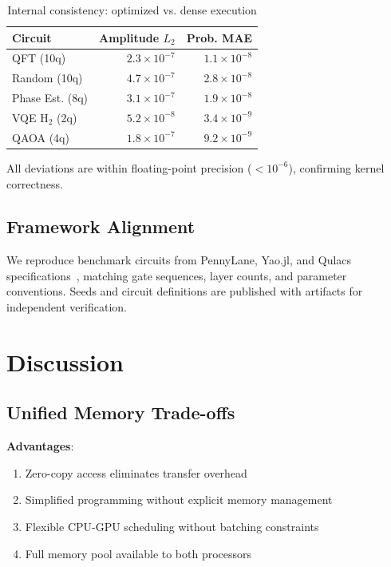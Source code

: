 \documentclass[runningheads]{llncs}
\begin{document}
\begin{table}[t]
\caption{Internal consistency: optimized vs. dense execution}
\label{tab:parity}
\centering
\begin{tabular}{lrr}
\toprule
Circuit & Amplitude $L_2$ & Prob. MAE \\
\midrule
QFT (10q) & $2.3 \times 10^{-7}$ & $1.1 \times 10^{-8}$ \\
Random (10q) & $4.7 \times 10^{-7}$ & $2.8 \times 10^{-8}$ \\
Phase Est. (8q) & $3.1 \times 10^{-7}$ & $1.9 \times 10^{-8}$ \\
VQE H$_2$ (2q) & $5.2 \times 10^{-8}$ & $3.4 \times 10^{-9}$ \\
QAOA (4q) & $1.8 \times 10^{-7}$ & $9.2 \times 10^{-9}$ \\
\bottomrule
\end{tabular}
\end{table}

All deviations are within floating-point precision ($< 10^{-6}$), confirming kernel correctness.

\subsection{Framework Alignment}

We reproduce benchmark circuits from PennyLane, Yao.jl, and Qulacs specifications~\cite{PennyLane2022,YaoJL2024,Qulacs}, matching gate sequences, layer counts, and parameter conventions. Seeds and circuit definitions are published with artifacts for independent verification.

\section{Discussion}

\subsection{Unified Memory Trade-offs}

\textbf{Advantages}:
\begin{enumerate}
    \item Zero-copy access eliminates transfer overhead
    \item Simplified programming without explicit memory management
    \item Flexible CPU-GPU scheduling without batching constraints
    \item Full memory pool available to both processors
\end{enumerate}
\end{document}
